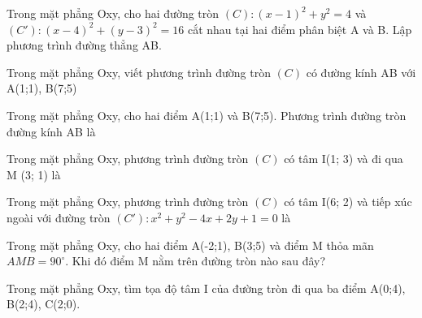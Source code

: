 \documentclass[12pt,a4paper]{book}
\begin{document}
\begin{ex}
Trong mặt phẳng Oxy, cho hai đường tròn $(C):(x-1)^2 + y^2 = 4$ và $(C'):(x-4)^2 + (y-3)^2 = 16$ cắt nhau tại hai điểm phân biệt A và B. Lập phương trình đường thẳng AB.
\loigiai{}
\end{ex}

\begin{ex}
Trong mặt phẳng Oxy, viết phương trình đường tròn $(C)$ có đường kính AB với A(1;1), B(7;5)
\loigiai{}
\end{ex}

\begin{ex}
Trong mặt phẳng Oxy, cho hai điểm A(1;1) và B(7;5). Phương trình đường tròn đường kính AB là
\loigiai{}
\end{ex}

\begin{ex}
Trong mặt phẳng Oxy, phương trình đường tròn $(C)$ có tâm I(1; 3) và đi qua M (3; 1) là
\loigiai{}
\end{ex}

\begin{ex}
Trong mặt phẳng Oxy, phương trình đường tròn $(C)$ có tâm I(6; 2) và tiếp xúc ngoài với đường tròn $(C'): x^2 + y^2 - 4x + 2y + 1 = 0$ là
\loigiai{}
\end{ex}

\begin{ex}
Trong mặt phẳng Oxy, cho hai điểm A(-2;1), B(3;5) và điểm M thỏa mãn $AMB = 90^\circ$. Khi đó điểm M nằm trên đường tròn nào sau đây?
\loigiai{}
\end{ex}

\begin{ex}
Trong mặt phẳng Oxy, tìm tọa độ tâm I của đường tròn đi qua ba điểm A(0;4), B(2;4), C(2;0).
\loigiai{}
\end{ex}
\end{document}
